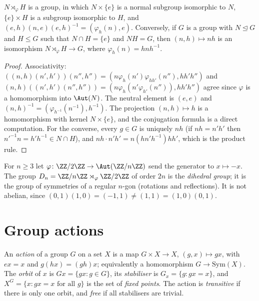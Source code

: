 \begin{proposition}\label{groups:proposition-semidirect}
$N \rtimes_\varphi H$ is a group, in which $N \times \{e\}$ is a normal subgroup
isomorphic to $N$, $\{e\} \times H$ is a subgroup isomorphic to $H$, and
$(e, h)(n, e)(e, h)^{-1} = (\varphi_h(n), e)$. Conversely, if $G$ is a group with
$N \trianglelefteq G$ and $H \leq G$ such that $N \cap H = \{e\}$ and $NH = G$, then
$(n, h) \mapsto nh$ is an isomorphism $N \rtimes_\varphi H \to G$, where
$\varphi_h(n) = hnh^{-1}$.
\end{proposition}

\begin{proof}
Associativity:
$((n,h)(n',h'))(n'',h'') = (n\varphi_h(n')\varphi_{hh'}(n''), hh'h'')$ and
$(n,h)((n',h')(n'',h'')) = (n\varphi_h(n'\varphi_{h'}(n'')), hh'h'')$ agree since
$\varphi$ is a homomorphism into $\Aut(N)$. The neutral element is $(e, e)$ and
$(n,h)^{-1} = (\varphi_{h^{-1}}(n^{-1}), h^{-1})$. The projection
$(n, h) \mapsto h$ is a homomorphism with kernel $N \times \{e\}$, and the conjugation
formula is a direct computation. For the converse, every $g \in G$ is uniquely
$nh$ (if $nh = n'h'$ then $n'^{-1}n = h'h^{-1} \in N \cap H$), and
$nh \cdot n'h' = n(hn'h^{-1})hh'$, which is the product rule.
\end{proof}

\begin{example}\label{groups:example-dihedral}
For $n \geq 3$ let $\varphi \colon \ZZ/2\ZZ \to \Aut(\ZZ/n\ZZ)$ send the generator to
$x \mapsto -x$. The group $D_n = \ZZ/n\ZZ \rtimes_\varphi \ZZ/2\ZZ$ of order $2n$ is the
\emph{dihedral group}; it is the group of symmetries of a regular $n$-gon (rotations
and reflections). It is not abelian, since $(0,1)(1,0) = (-1, 1) \neq (1, 1) = (1,0)(0,1)$.
\end{example}

\section{Group actions}\label{groups:section-actions}

\begin{definition}\label{groups:definition-action}
An \emph{action} of a group $G$ on a set $X$ is a map $G \times X \to X$,
$(g, x) \mapsto gx$, with $ex = x$ and $g(hx) = (gh)x$; equivalently a homomorphism
$G \to \mathrm{Sym}(X)$. The \emph{orbit} of $x$ is $Gx = \{gx : g \in G\}$, its
\emph{stabiliser} is $G_x = \{g : gx = x\}$, and $X^G = \{x : gx = x \text{ for all } g\}$
is the set of \emph{fixed points}. The action is \emph{transitive} if there is
only one orbit, and \emph{free} if all stabilisers are trivial.
\end{definition}

